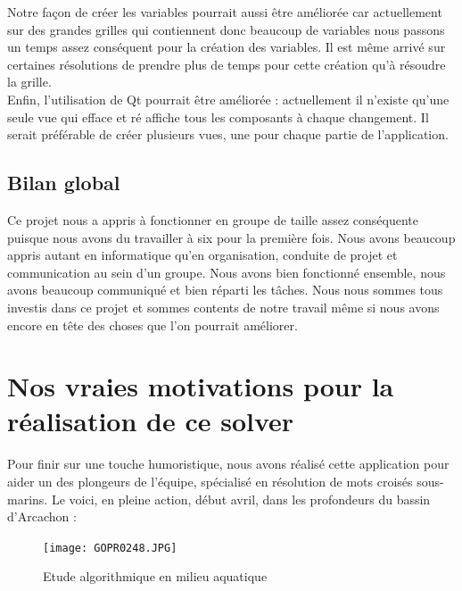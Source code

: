 \documentclass [ 11 pt ] {article}
\begin{document}
Notre façon de créer les variables pourrait aussi être améliorée car actuellement sur des grandes grilles qui contiennent donc beaucoup de variables nous passons un temps assez conséquent pour la création des variables. Il est même arrivé sur certaines résolutions de prendre plus de temps pour cette création qu'à résoudre la grille.\\

Enfin, l'utilisation de Qt pourrait être améliorée : actuellement il n'existe qu'une seule vue qui efface et ré affiche tous les composants à chaque changement. Il serait préférable de créer plusieurs vues, une pour chaque partie de l'application. \\

\subsection{Bilan global}
Ce projet nous a appris à fonctionner en groupe de taille assez conséquente puisque nous avons du travailler à six pour la première fois. Nous avons beaucoup appris autant en informatique qu’en organisation, conduite de projet et communication au sein d’un groupe. Nous avons bien fonctionné ensemble, nous avons beaucoup communiqué et bien réparti les tâches. Nous nous sommes tous investis dans ce projet et sommes contents de notre travail même si nous avons encore en tête des choses que l’on pourrait améliorer.


\newpage
\printbibliography
\newpage
\section{Nos vraies motivations pour la réalisation de ce solver}
Pour finir sur une touche humoristique, nous avons réalisé cette application pour aider un des plongeurs de l'équipe, spécialisé en résolution de mots croisés sous-marins. Le voici, en pleine action, début avril, dans les profondeurs du bassin d'Arcachon : 

\begin{figure}[H] 
                \center 
                \texttt{[image: GOPR0248.JPG]}
                \caption{Etude algorithmique en milieu aquatique}
\end{figure}
\end{document}
